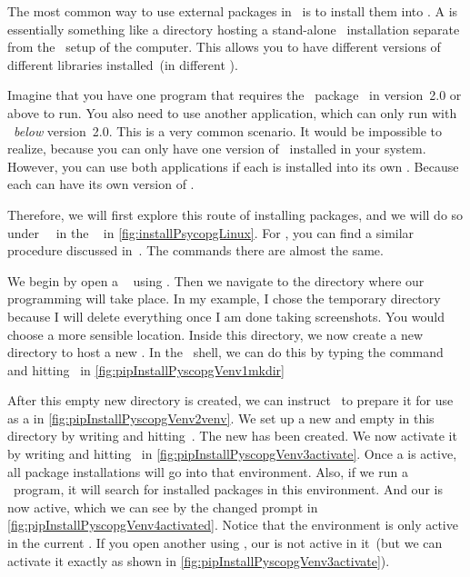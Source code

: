 The most common way to use external packages in \python\ is to install them into .
A  is essentially something like a directory hosting a stand-alone \python\ installation separate from the \python\ setup of the computer.
This allows you to have different versions of different libraries installed~(in different ).

Imagine that you have one program that requires the \python\ package \numpy\ in version~2.0 or above to run.
You also need to use another application, which can only run with \numpy\ \emph{below} version~2.0.
This is a very common scenario.
It would be impossible to realize, because you can only have one version of \numpy\ installed in your system.
However, you can use both applications if each is installed into its own .
Because each  can have its own version of \numpy.

Therefore, we will first explore this route of installing packages, and we will do so under \ubuntu\ \linux\ in the \bash\  in \cref{fig:installPsycopgLinux}.
For \microsoftWindows, you can find a similar procedure discussed in~\cite{programmingWithPython}.
The commands there are almost the same.

We begin by open a \bash\  using \ubuntuTerminal.
Then we navigate to the directory where our programming will take place.
In my example, I chose the temporary directory  because I will delete everything once I am done taking screenshots.
You would choose a more sensible location.
Inside this directory, we now create a new directory  to host a new .
In the \bash\ shell, we can do this by typing the command  and hitting~\keys{\enter} in \cref{fig:pipInstallPyscopgVenv1mkdir}

After this empty new directory is created, we can instruct \python\ to prepare it for use as a  in \cref{fig:pipInstallPyscopgVenv2venv}.
We set up a new and empty  in this directory by writing  and hitting~\keys{\enter}.
The new  has been created.
We now activate it by writing  and hitting~\keys{\enter} in \cref{fig:pipInstallPyscopgVenv3activate}.
Once a  is active, all package installations will go into that environment.
Also, if we run a \python\ program, it will search for installed packages in this environment.
And our   is now active, which we can see by the changed prompt in \cref{fig:pipInstallPyscopgVenv4activated}.
Notice that the environment is only active in the current .
If you open another  using \ubuntuTerminal, our  is not active in it~(but we can activate it exactly as shown in \cref{fig:pipInstallPyscopgVenv3activate}).

